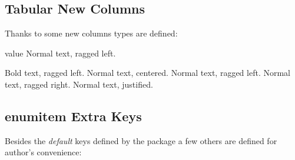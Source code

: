 \documentclass[article,nofontwarning,nogeometry,english,tocdepth=3,secdepth=3]{ufrgscca} %
\begin{document}
\subsection{Tabular New Columns}
Thanks to  some new columns types are defined:
\begin{describelist}{value}
	 {  Normal text, ragged left.}

	 {  Bold text, ragged left.}
	 {  Normal text, centered.}
	 {  Normal text, ragged left.}
	 {  Normal text, ragged right.}
	 {  Normal text, justified.}
	\end{describelist}



\subsection{enumitem Extra Keys}
Besides the \emph{default} keys defined by the  package a few others are defined for author's convenience:
\end{document}
